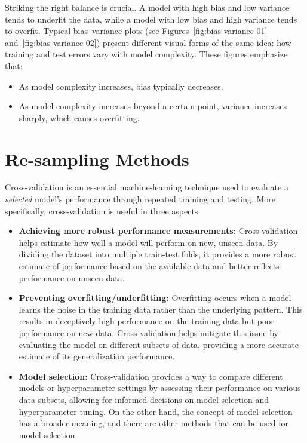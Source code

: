 \documentclass[12pt]{article}
\begin{document}
Striking the right balance is crucial. A model with high bias and low variance tends to underfit the data, while a model with low bias and high variance tends to overfit. Typical bias--variance plots (see Figures~\ref{fig:bias-variance-01} and~\ref{fig:bias-variance-02}) present different visual forms of the same idea: how training and test errors vary with model complexity. These figures emphasize that:
\begin{itemize}
    \item As model complexity increases, bias typically decreases.
    \item As model complexity increases beyond a certain point, variance increases sharply, which causes overfitting.
\end{itemize}


\section{Re-sampling Methods}
Cross-validation is an essential machine-learning technique used to evaluate a \textit{selected} model's performance through repeated training and testing. More specifically, cross-validation is useful in three aspects:

\begin{itemize}
    \item \textbf{Achieving more robust performance measurements:} Cross-validation helps estimate how well a model will perform on new, unseen data. By dividing the dataset into multiple train-test folds, it provides a more robust estimate of performance based on the available data and better reflects performance on unseen data.
    
    \item \textbf{Preventing overfitting/underfitting:} Overfitting occurs when a model learns the noise in the training data rather than the underlying pattern. This results in deceptively high performance on the training data but poor performance on new data. Cross-validation helps mitigate this issue by evaluating the model on different subsets of data, providing a more accurate estimate of its generalization performance.
    
    \item \textbf{Model selection:} Cross-validation provides a way to compare different models or hyperparameter settings by assessing their performance on various data subsets, allowing for informed decisions on model selection and hyperparameter tuning. On the other hand, the concept of model selection has a broader meaning, and there are other methods that can be used for model selection.
\end{itemize}
\end{document}
